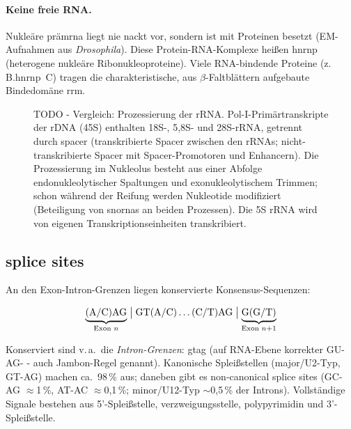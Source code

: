 \paragraph{Keine freie RNA.} Nukleäre \gls{prämrna} liegt nie nackt vor,
sondern ist mit Proteinen besetzt (EM-Aufnahmen aus \emph{Drosophila}). Diese
Protein-RNA-Komplexe heißen \gls{hnrnp} (heterogene nukleäre
Ribonukleoproteine).
Viele RNA-bindende Proteine (z.\,B.\gls{hnrnp} \,C) tragen die
charakteristische, aus $\beta$-Faltblättern aufgebaute Bindedomäne
\gls{rrm}.


\begin{figure}[H]
    \centering
    \caption{TODO - Vergleich: Prozessierung der rRNA. Pol-I-Primärtranskripte der
    rDNA (45S) enthalten 18S-, 5,8S- und 28S-rRNA, getrennt durch
    \gls{spacer} (transkribierte Spacer zwischen den rRNAs;
    nicht-transkribierte Spacer mit Spacer-Promotoren und Enhancern). Die
    Prozessierung im Nukleolus besteht aus einer Abfolge endonukleolytischer
    Spaltungen und exonukleolytischem Trimmen; schon während der
    Reifung werden Nukleotide modifiziert (Beteiligung von \gls{snorna}s an
    beiden Prozessen). Die 5S rRNA wird von eigenen Transkriptionseinheiten
    transkribiert.}\label{fig:rrna_prozessierung}
\end{figure}


\subsection{splice sites}\label{subsec:splice-sites}
An den Exon-Intron-Grenzen liegen konservierte Konsensus-Sequenzen:

\[
    \underbrace{(\text{A/C})\text{AG}}_{\text{Exon }n}
    \bigm| \text{GT(A/C)} \dots (\text{C/T})\text{AG} \bigm|
    \underbrace{\text{G(G/T)}}_{\text{Exon }n{+}1}
\]

Konserviert sind v.\,a.\ die \emph{Intron-Grenzen}: \gls{gtag} (auf RNA-Ebene
korrekter GU-AG- - auch Jambon-Regel genannt).   
Kanonische Spleißstellen (major/U2-Typ,
GT-AG) machen ca.\ 98\,\% aus; daneben gibt es non-canonical
splice sites (GC-AG $\approx$1\,\%, AT-AC $\approx$0,1\,\%; minor/U12-Typ
$\sim$0,5\,\% der Introns).
Vollständige Signale bestehen aus
5'-Spleißstelle, \gls{verzweigungsstelle},
\gls{polypyrimidin} und 3'-Spleißstelle.


